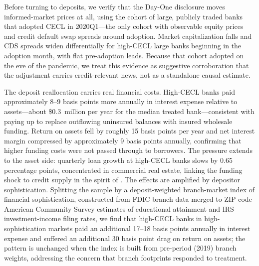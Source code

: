 Before turning to deposits, we verify that the Day-One disclosure moves
informed-market prices at all, using the cohort of large, publicly traded banks
that adopted CECL in 2020Q1---the only cohort with observable equity prices and
credit default swap spreads around adoption.  Market capitalization falls and
CDS spreads widen differentially for high-CECL large banks beginning in the
adoption month, with flat pre-adoption leads.  Because that cohort adopted on
the eve of the pandemic, we treat this evidence as suggestive corroboration
that the adjustment carries credit-relevant news, not as a standalone causal
estimate.

The deposit reallocation carries real financial costs.  High-CECL banks paid
approximately 8--9 basis points more annually in interest expense relative to
assets---about \$0.3~million per year for the median treated bank---consistent
with paying up to replace outflowing uninsured balances with insured wholesale
funding.  Return on assets fell by roughly 15 basis points per year and net
interest margin compressed by approximately 9 basis points annually, confirming
that higher funding costs were not passed through to borrowers.  The pressure
extends to the asset side: quarterly loan growth at high-CECL banks slows by
0.65 percentage points, concentrated in commercial real estate, linking the
funding shock to credit supply in the spirit of \citet{granja2025current}.  The
effects are amplified by depositor sophistication.  Splitting the sample by a
deposit-weighted branch-market index of financial sophistication, constructed
from FDIC branch data merged to ZIP-code American Community Survey estimates of
educational attainment and IRS investment-income filing rates, we find that
high-CECL banks in high-sophistication markets paid an additional 17--18 basis
points annually in interest expense and suffered an additional 30 basis point
drag on return on assets; the pattern is unchanged when the index is built from
pre-period (2019) branch weights, addressing the concern that branch footprints
responded to treatment.

